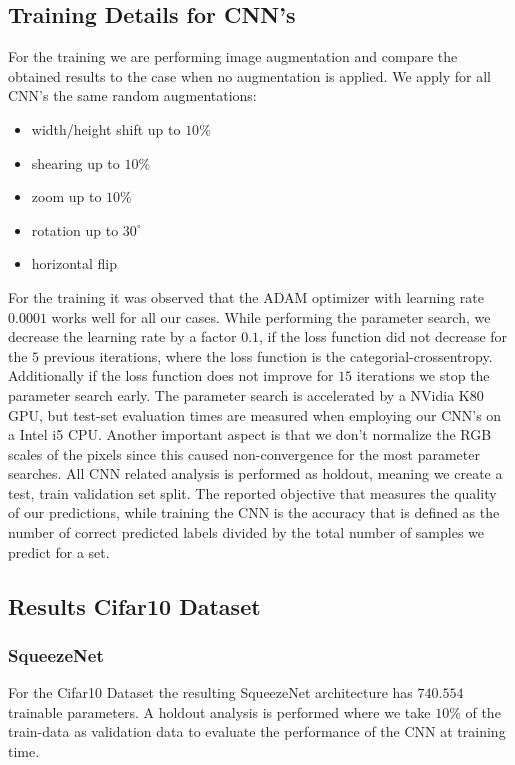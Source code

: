 \documentclass[11pt]{article}
\begin{document}
\subsection{Training Details for CNN's}
For the training we are performing image augmentation and compare the obtained results to the case when no augmentation is applied. We apply for all CNN's the same random augmentations:
%
\begin{itemize}
	\item width/height shift up to $10\%$
	\item shearing up to $10\%$
	\item zoom up to $10\%$
	\item rotation up to $30^\circ$
	\item horizontal flip
\end{itemize}
%
For the training it was observed that the ADAM optimizer with learning rate $0.0001$ works well for all our cases. While performing the parameter search, we decrease the learning rate by a factor $0.1$, if the loss function did not decrease for the $5$ previous iterations, where the loss function is the categorial-crossentropy. Additionally if the loss function does not improve for $15$ iterations we stop the parameter search early. The parameter search is accelerated by a NVidia K80 GPU, but test-set evaluation times are measured when employing our CNN's on a Intel i5 CPU. Another important aspect is that we don't normalize the RGB scales of the pixels since this caused non-convergence for the most parameter searches. All CNN related analysis is performed as holdout, meaning we create a test, train validation set split. The reported objective that measures the quality of our predictions, while training the CNN is the accuracy that is defined as the number of correct predicted labels divided by the total number of samples we predict for a set. 



\subsection{Results Cifar10 Dataset}

\subsubsection{SqueezeNet}
For the Cifar10 Dataset the resulting SqueezeNet architecture has $740.554$ trainable parameters.
A holdout analysis is performed where we take $10\%$ of the train-data as validation data to evaluate the performance of the CNN at training time.
\end{document}
